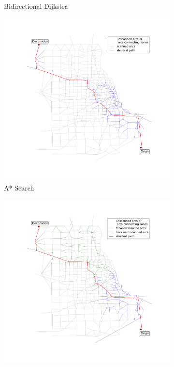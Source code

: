 \begin{figure}
\begin{subfigure}{.5\textwidth}
        \caption{Bidirectional Dijkstra}
        \label{fig:chicago_bidirect}
    \end{subfigure}
    \begin{subfigure}{.5\textwidth}
        \centering
        \includegraphics[width=\textwidth,trim=120px 120px 48px 0px,clip]{img/chicago_astar}
        \caption{A* Search}
        \label{fig:chicago_Astar_bidirect}
    \end{subfigure}%
    \begin{subfigure}{.5\textwidth}
        \centering
        \includegraphics[width=\textwidth,trim=120px 120px 48px 0px,clip]{img/chicago_astar_bidirect}

\end{subfigure}
\end{figure}
